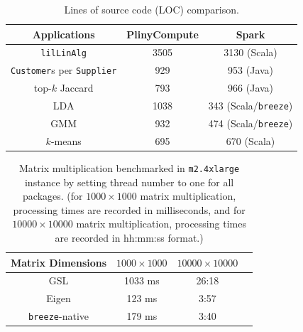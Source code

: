 \begin{table}[H]
\small
\begin{center}
\begin{tabular}{|c||c|c|}
\hline
Applications & PlinyCompute & Spark\\
\hline
\texttt{lilLinAlg} &3505& 3130 (Scala)\\
\texttt{Customer}s per \texttt{Supplier}&929 &953 (Java)\\
top-$k$ Jaccard &793 & 966 (Java)\\
LDA &1038  &343 (Scala/\texttt{breeze})\\
GMM&932 & 474 (Scala/\texttt{breeze})\\
$k$-means &695  &670 (Scala)\\
\hline
\end{tabular}
\caption{Lines of source code (LOC) comparison.}
\label{fig:LOC}
\end{center}
\vspace{-20pt}
\end{table}

\begin{table}[H]
\small
\begin{center}
\begin{tabular}{|c||c|c|c|}
\hline
Matrix Dimensions & $1000\times1000$ & $10000\times10000$ \\
\hline
GSL &1033 ms &26:18  \\
Eigen &123 ms  &3:57\\
\texttt{breeze}-native &179 ms  &3:40\\
\hline
\end{tabular}
\caption{Matrix multiplication benchmarked in
  \texttt{m2.4xlarge} instance by setting thread number  to one for all
  packages. (for
  $1000\times1000$ matrix multiplication, processing times are recorded in
  milliseconds, and for $10000\times10000$ matrix multiplication, processing times are
  recorded in hh:mm:ss format.)}
\label{fig:matrixMult}
\end{center}
\vspace{-20pt}
\end{table}

